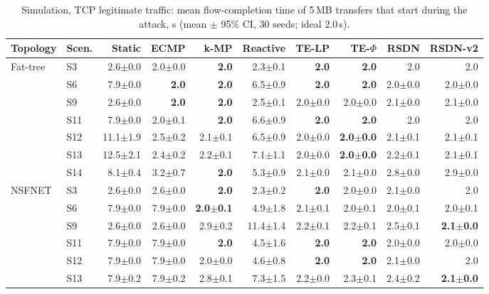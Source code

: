 \begin{table}[t]\centering\scriptsize
\caption{Simulation, TCP legitimate traffic: mean flow-completion time of 5\,MB transfers that start during the attack, s (mean $\pm$ 95\% CI, 30 seeds; ideal 2.0\,s).}\label{tab:sim_fct}
\setlength{\tabcolsep}{3pt}
\begin{tabular}{llrrrrrrrr}
\toprule
Topology & Scen. & Static & ECMP & k-MP & Reactive & TE-LP & TE-$\Phi$ & RSDN & RSDN-v2\\
\midrule
Fat-tree & S3 & 2.6$\pm$0.0 & 2.0$\pm$0.0 & \textbf{2.0} & 2.3$\pm$0.1 & \textbf{2.0} & \textbf{2.0} & 2.0 & 2.0\\
 & S6 & 7.9$\pm$0.0 & \textbf{2.0} & \textbf{2.0} & 6.5$\pm$0.9 & \textbf{2.0} & \textbf{2.0} & 2.0$\pm$0.0 & 2.0$\pm$0.0\\
 & S9 & 2.6$\pm$0.0 & \textbf{2.0} & \textbf{2.0} & 2.5$\pm$0.1 & 2.0$\pm$0.0 & 2.0$\pm$0.0 & 2.1$\pm$0.0 & 2.1$\pm$0.0\\
 & S11 & 7.9$\pm$0.0 & 2.0$\pm$0.1 & \textbf{2.0} & 6.6$\pm$0.9 & \textbf{2.0} & \textbf{2.0} & 2.0 & 2.0\\
 & S12 & 11.1$\pm$1.9 & 2.5$\pm$0.2 & 2.1$\pm$0.1 & 6.5$\pm$0.9 & 2.0$\pm$0.0 & \textbf{2.0$\pm$0.0} & 2.1$\pm$0.1 & 2.1$\pm$0.1\\
 & S13 & 12.5$\pm$2.1 & 2.4$\pm$0.2 & 2.2$\pm$0.1 & 7.1$\pm$1.1 & 2.0$\pm$0.0 & \textbf{2.0$\pm$0.0} & 2.2$\pm$0.1 & 2.1$\pm$0.1\\
 & S14 & 8.1$\pm$0.4 & 3.2$\pm$0.7 & \textbf{2.0} & 5.3$\pm$0.9 & 2.1$\pm$0.0 & 2.1$\pm$0.0 & 2.8$\pm$0.0 & 2.9$\pm$0.0\\
\midrule
NSFNET & S3 & 2.6$\pm$0.0 & 2.6$\pm$0.0 & \textbf{2.0} & 2.3$\pm$0.2 & \textbf{2.0} & 2.0$\pm$0.0 & 2.1$\pm$0.0 & 2.0\\
 & S6 & 7.9$\pm$0.0 & 7.9$\pm$0.0 & \textbf{2.0$\pm$0.1} & 4.9$\pm$1.8 & 2.1$\pm$0.1 & 2.0$\pm$0.1 & 2.0$\pm$0.1 & 2.0$\pm$0.1\\
 & S9 & 2.6$\pm$0.0 & 2.6$\pm$0.0 & 2.9$\pm$0.2 & 11.4$\pm$1.4 & 2.2$\pm$0.1 & 2.2$\pm$0.1 & 2.5$\pm$0.1 & \textbf{2.1$\pm$0.0}\\
 & S11 & 7.9$\pm$0.0 & 7.9$\pm$0.0 & \textbf{2.0} & 4.5$\pm$1.6 & \textbf{2.0} & \textbf{2.0} & 2.0$\pm$0.0 & 2.0$\pm$0.0\\
 & S12 & 7.9$\pm$0.0 & 7.9$\pm$0.0 & 2.0$\pm$0.0 & 4.6$\pm$0.8 & \textbf{2.0} & \textbf{2.0} & 2.1$\pm$0.0 & 2.0\\
 & S13 & 7.9$\pm$0.2 & 7.9$\pm$0.2 & 2.8$\pm$0.1 & 7.3$\pm$1.5 & 2.2$\pm$0.0 & 2.3$\pm$0.1 & 2.4$\pm$0.2 & \textbf{2.1$\pm$0.0}\\

\end{tabular}
\end{table}
